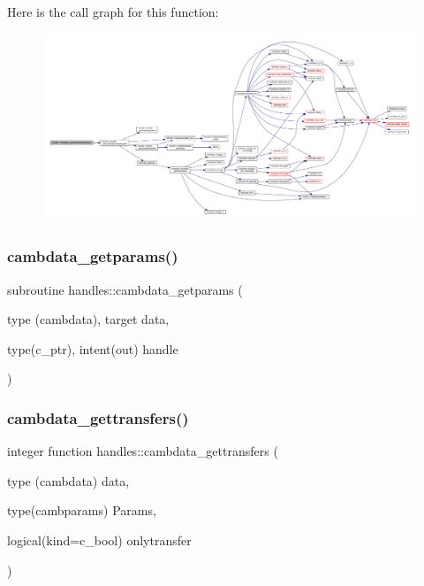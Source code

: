 Here is the call graph for this function\+:
\nopagebreak
\begin{figure}[H]
\begin{center}
\leavevmode
\includegraphics[width=350pt]{namespacehandles_a26542fd10068a2b3d57617a97f935286_cgraph}
\end{center}
\end{figure}
\mbox{\label{namespacehandles_a564998825329a378540701dda7e31957}} 
\subsubsection{\texorpdfstring{cambdata\+\_\+getparams()}{cambdata\_getparams()}}
{\footnotesize\ttfamily subroutine handles\+::cambdata\+\_\+getparams (\begin{DoxyParamCaption}\item[{type (cambdata), target}]{data,  }\item[{type(c\+\_\+ptr), intent(out)}]{handle }\end{DoxyParamCaption})}

\mbox{\label{namespacehandles_a386ee0a28e6860d14047f052c918ca43}} 
\subsubsection{\texorpdfstring{cambdata\+\_\+gettransfers()}{cambdata\_gettransfers()}}
{\footnotesize\ttfamily integer function handles\+::cambdata\+\_\+gettransfers (\begin{DoxyParamCaption}\item[{type (cambdata)}]{data,  }\item[{type(cambparams)}]{Params,  }\item[{logical(kind=c\+\_\+bool)}]{onlytransfer }\end{DoxyParamCaption})}




